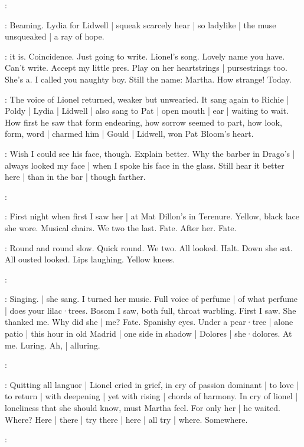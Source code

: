 \simon:

:
Beaming.
Lydia for Lidwell |
squeak scarcely hear |
so ladylike |
the muse unsqueaked |
a ray of hope.

\BloomInt:
 it is.
Coincidence.
Just going to write.
Lionel's song.
Lovely name you have.
Can't write.
Accept my little pres.
Play on her heartstrings |
pursestrings too.
She's a.
I called you naughty boy.
Still the name:
Martha.
How strange!
Today.

:
The voice of Lionel returned,
weaker but unwearied.
It sang again to Richie |
Poldy |
Lydia |
Lidwell |
also sang to Pat |
open mouth |
ear |
waiting to wait.
How first he saw that form endearing,
how sorrow seemed to part,
how look,
form,
word |
charmed him |
Gould |
Lidwell,
won Pat Bloom's heart.

\BloomInt:
Wish I could see his face,
though.
Explain better.
Why the barber in Drago's |
always looked my face |
when I spoke his face in the glass.
Still hear it better here |
than in the bar |
though farther.

\simon:

\BloomInt:
First night when first I saw her |
at Mat Dillon's in Terenure.
Yellow,
black lace she wore.
Musical chairs.
We two the last.
Fate.
After her.
Fate.

\BloomInt:
Round and round slow.
Quick round.
We two.
All looked.
Halt.
Down she
sat.
All ousted looked.
Lips laughing.
Yellow knees.

\simon:

\BloomInt:
Singing.
 |
she sang.
I turned her music.
Full voice of perfume |
of what perfume |
does your lilac·trees.
Bosom I saw,
both full,
throat warbling.
First I saw.
She thanked me.
Why did she |
me?
Fate.
Spanishy eyes.
Under a pear·tree |
alone patio |
this hour in old Madrid |
one side in shadow |
Dolores |
she·dolores.
At me.
Luring.
Ah, |
alluring.

\simon:

:
Quitting all languor |
Lionel cried in grief,
in cry of passion dominant |
to love |
to return |
with deepening |
yet with rising |
chords of harmony.
In cry of lionel |
loneliness that she should know,
must Martha feel.
For only her |
he waited.
Where?
Here |
there |
try there |
here |
all try |
where.
Somewhere.

\simon:

